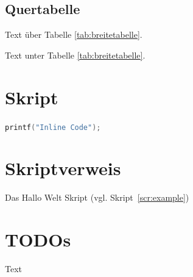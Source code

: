 \subsection{Quertabelle}
\begin{landscape}
    Text über Tabelle \ref{tab:breitetabelle}.
	\begin{table}[H]
		\caption{Breites Tabellenbeispiel}
		\label{tab:breitetabelle}
		\centering
	\end{table}
	Text unter Tabelle \ref{tab:breitetabelle}.
\end{landscape}

\section{Skript}

\lstinline[language=c]|printf("Inline Code");|





\section{Skriptverweis}
Das Hallo Welt Skript (vgl. Skript~\ref{scr:example})

\section{TODOs}
Text 

